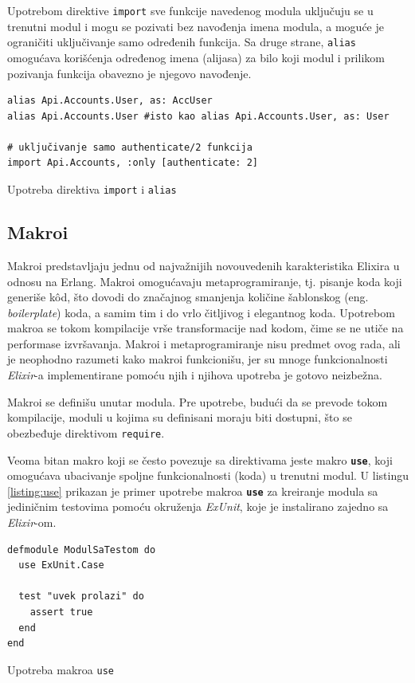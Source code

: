 \documentclass[12pt,oneside]{memoir}
\begin{document}
Upotrebom direktive \texttt{import} sve funkcije navedenog modula uključuju se u trenutni
modul i mogu se pozivati bez navođenja imena modula, a moguće je ograničiti uključivanje samo
određenih funkcija. Sa druge strane, \texttt{alias} omogućava korišćenja određenog imena
(alijasa) za bilo koji modul i prilikom pozivanja funkcija obavezno je njegovo navođenje.
\begin{listing}[h]
\begin{verbatim}
alias Api.Accounts.User, as: AccUser
alias Api.Accounts.User #isto kao alias Api.Accounts.User, as: User

# uključivanje samo authenticate/2 funkcija 
import Api.Accounts, :only [authenticate: 2] 
\end{verbatim}
\caption{Upotreba direktiva \texttt{import} i \texttt{alias}}
\label{listing:elixirAliasImport}
\end{listing}

\subsection{Makroi}
Makroi predstavljaju jednu od najvažnijih novouvedenih karakteristika Elixira u odnosu na Erlang.
Makroi omogućavaju metaprogramiranje, tj. pisanje koda koji generiše k\^{o}d, što dovodi do 
značajnog smanjenja količine šablonskog (eng. \emph{boilerplate}) koda, a samim tim i do
vrlo čitljivog i elegantnog koda. Upotrebom makroa se tokom kompilacije vrše transformacije
nad kodom, čime se ne utiče na performase izvršavanja. Makroi i metaprogramiranje nisu predmet
ovog rada, ali je neophodno razumeti kako makroi funkcionišu, jer su mnoge funkcionalnosti
\emph{Elixir}-a implementirane pomoću njih i njihova upotreba je gotovo neizbežna. 

Makroi se definišu unutar modula. Pre upotrebe, budući da se prevode tokom kompilacije, moduli
u kojima su definisani moraju biti dostupni, što se obezbeđuje direktivom \texttt{require}. 

Veoma bitan makro koji se često povezuje sa direktivama jeste makro \texttt{\textbf{use}},
koji omogućava ubacivanje spoljne funkcionalnosti (koda) u trenutni modul. U listingu 
\ref{listing:use} prikazan je primer upotrebe makroa \texttt{\textbf{use}} za kreiranje modula
sa jediničnim testovima pomoću okruženja \emph{ExUnit}, koje je instalirano zajedno sa \emph{Elixir}-om.
\begin{listing}[h]
\begin{verbatim}
defmodule ModulSaTestom do
  use ExUnit.Case

  test "uvek prolazi" do
    assert true
  end
end
\end{verbatim}
\caption{Upotreba makroa \texttt{use}}
\label{listing:use}
\end{listing}
  
\end{document}
